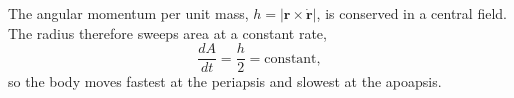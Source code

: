 The angular momentum per unit mass, $h = |\mathbf r \times \dot{\mathbf r}|$,
is conserved in a central field.
The radius therefore sweeps area at a constant rate,
\begin{equation}
  \frac{dA}{dt} = \frac{h}{2} = \text{constant},
\end{equation}
so the body moves fastest at the periapsis and slowest at the apoapsis.
